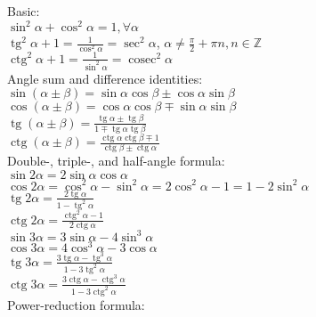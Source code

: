 \documentclass{letter}
\DeclareMathOperator{\tg}{tg}
\DeclareMathOperator{\ctg}{ctg}
\DeclareMathOperator{\cosec}{cosec}
\begin{document}
Basic: \\

$\sin^2 \alpha + \cos^2 \alpha = 1 ,  \forall \alpha $ \\
$\tg^2 \alpha + 1 = \frac{1}{\cos^2 \alpha} = \sec^2 \alpha $, $\alpha \neq \frac{\pi}{2} + \pi n, n \in \mathbb Z $ \\
$\ctg^2 \alpha + 1 = \frac{1}{\sin^2 \alpha} = \cosec^2 \alpha$ \\

Angle sum and difference identities: \\

$\sin \left( \alpha \pm \beta \right) = \sin \alpha \cos \beta \pm \cos \alpha \sin \beta$ \\
$\cos \left( \alpha \pm \beta \right) = \cos \alpha \cos \beta \mp \sin \alpha \sin \beta$ \\
$\tg \left( \alpha \pm \beta \right) = \frac{ \tg \alpha \pm \tg \beta}{1 \mp \tg \alpha \tg\beta}$ \\
$\ctg \left( \alpha \pm \beta \right) = \frac{ \ctg \alpha \ctg \beta \mp 1}{\ctg \beta \pm \ctg\alpha}$ \\

Double-, triple-, and half-angle formula: \\

$ \sin 2 \alpha = 2 {\sin \alpha}{\cos \alpha} $ \\
$ \cos 2 \alpha = {\cos^2 \alpha} - {\sin^2 \alpha} = 2 {\cos^2 \alpha} - 1 = 1 - 2 {\sin^2 \alpha} $ \\
$ \tg 2 \alpha = \frac{2 \tg \alpha}{1 - \tg^2 \alpha} $ \\
$ \ctg 2 \alpha = \frac{\ctg^2 \alpha - 1}{2 \ctg \alpha} $ \\

$\sin 3\alpha = 3 \sin \alpha - 4 \sin^3\alpha \,$ \\
$\cos 3\alpha = 4 \cos^3\alpha - 3 \cos \alpha \,$ \\
$\tg 3\alpha = \frac{3 \tg\alpha - \tg^3\alpha}{1 - 3 \tg^2\alpha}$ \\
$\ctg 3\alpha = \frac{3 \ctg\alpha - \ctg^3\alpha}{1 - 3 \ctg^2\alpha}$ \\

Power-reduction formula: \\
\end{document}
